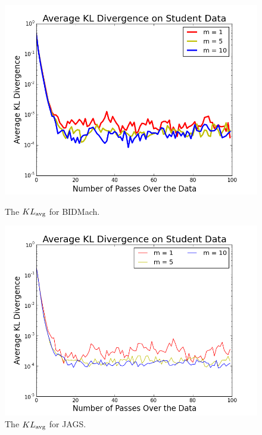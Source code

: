 \documentclass{article} %
\begin{document}
\begin{figure}[t]
  \centering
  \begin{minipage}{.5\textwidth}
    \centering
    \includegraphics[width=1\textwidth]{fig_kldiv_twobatches}
    \caption{The $KL_{\rm avg}$ for BIDMach.}
    \label{fig:kl_bidmach}
  \end{minipage}\hfill
    \begin{minipage}{.5\textwidth}
    \centering
    \includegraphics[width=1\textwidth]{fig_kl_div_25_50_perc}
    \caption{The $KL_{\rm avg}$ for JAGS.}
    \label{fig:kl_jags}
  \end{minipage}
\end{figure}
\end{document}
